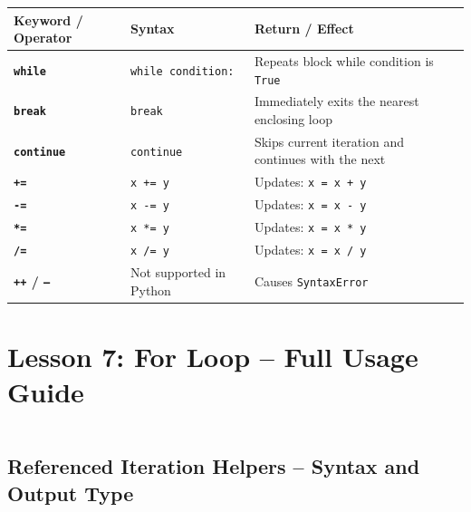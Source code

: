 \documentclass[a4paper,11pt]{article}
\begin{document}
	\begin{tabular}{>{\bfseries}p{4cm} p{7.5cm} p{3cm}}
		\toprule
		Keyword / Operator & Syntax & Return / Effect \\
		\midrule
		
		\texttt{while} & \texttt{while condition:} & Repeats block while condition is \texttt{True} \\
		
		\texttt{break} & \texttt{break} & Immediately exits the nearest enclosing loop \\
		
		\texttt{continue} & \texttt{continue} & Skips current iteration and continues with the next \\
		
		\texttt{+=} & \texttt{x += y} & Updates: \texttt{x = x + y} \\
		
		\texttt{-=} & \texttt{x -= y} & Updates: \texttt{x = x - y} \\
		
		\texttt{*=} & \texttt{x *= y} & Updates: \texttt{x = x * y} \\
		
		\texttt{/=} & \texttt{x /= y} & Updates: \texttt{x = x / y} \\
		
		\texttt{++} / \texttt{--} & Not supported in Python & Causes \texttt{SyntaxError} \\
		
		\bottomrule
	\end{tabular}
	
	

	\section{Lesson 7: For Loop – Full Usage Guide}
	\inputminted{python}{Python_Files/for_loop_guid.py}
	
	\vspace{1em}
	\subsection*{Referenced Iteration Helpers – Syntax and Output Type}
	
\end{document}

